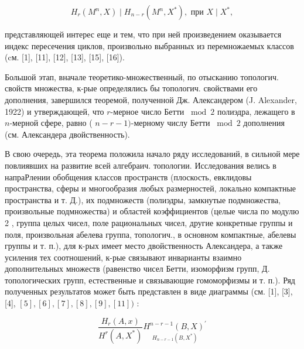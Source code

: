 \documentclass[10pt]{article}
\begin{document}
\[

H_{r}\left(M^{n}, X\right) \mid H_{n-r}\left(M^{n}, X^{*}\right), \text { при } X \mid X^{*},

\]



представляющей интерес еще и тем, что при ней произведением оказывается индекс пересечения циклов, произвольно выбранных из перемножаемых классов (cм. [1], [11], [12], [13], [15], [16]).



Большой этап, вначале теоретико-множественный, по отысканию топологич. свойств множества, к-рые определялись бы топологич. свойствами его дополнения, завершился теоремой, полученной Дж. Александером (J. Alexander, 1922) и утверждающей, что $r$-мерное число Бетти $\bmod 2$ полиэдра, лежащего в $n$-мерной сфере, равно ( $n-r-1)$-мерному числу Бетти $\bmod 2$ дополнения (см. Александера двойственность).



В свою очередь, эта теорема положила начало ряду исследований, в сильной мере повлиявших на развитие всей алгебраич. топологии. Исследования велись в напраРлении обобщения классов пространств (плоскость, евклидовы пространства, сферы и многообразия любых размерностей, локально компактные пространства и т. Д.), их подмножеств (полиэдры, замкнутые подмножества, произвольные подмножества) и областей коэффициентов (целые числа по модулю 2 , группа целых чисел, поле рациональных чисел, другие конкретные группы и поля, произвольная абелева группа, топологич., в основном компактные, абелевы группы и т. п.), для к-рых имеет место двойственность Александера, а также усиления тех соотношений, к-рые связывают инварианты взаимно дополнительных множеств (равенство чисел Бетти, изоморфизм групп, Д. топологических групп, естественные и связывающие гомоморфизмы и т. п.). Ряд полученных результатов может быть представлен в виде диаграммы (см. [1], [3], [4], $[5],[6],[7],[8],[9],[11])$ :



\[

\frac{H_{r}(A, x)}{H^{r}\left(A, X^{*}\right)} \underset{H_{n-r-1}\left(B, X^{*}\right)}{H^{n-r-1}(B, X)^{\prime}}

\]
\end{document}
